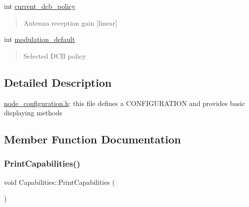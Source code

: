 \begin{DoxyCompactItemize}
int \hyperlink{structCapabilities_ae05428c083582018c872bd8d6da04638}{current\+\_\+dcb\+\_\+policy}
\begin{DoxyCompactList}\small\item\em \begin{quote}
Antenna reception gain \mbox{[}linear\mbox{]} \end{quote}
\end{DoxyCompactList}\item 
\mbox{\label{structCapabilities_aed928b77fc111cde1845dc9df3df8696}} 
int \hyperlink{structCapabilities_aed928b77fc111cde1845dc9df3df8696}{modulation\+\_\+default}
\begin{DoxyCompactList}\small\item\em \begin{quote}
Selected D\+CB policy \end{quote}
\end{DoxyCompactList}\end{DoxyCompactItemize}


\subsection{Detailed Description}
\hyperlink{node__configuration_8h_source}{node\+\_\+configuration.\+h}\+: this file defines a C\+O\+N\+F\+I\+G\+U\+R\+A\+T\+I\+ON and provides basic displaying methods 

\subsection{Member Function Documentation}
\mbox{\label{structCapabilities_a1a12dfd9ffe75c5bf62b2e5b526cb0d1}} 
\subsubsection{\texorpdfstring{Print\+Capabilities()}{PrintCapabilities()}}
{\footnotesize\ttfamily void Capabilities\+::\+Print\+Capabilities (\begin{DoxyParamCaption}{ }\end{DoxyParamCaption})\hspace{0.3cm}{\ttfamily [inline]}}



